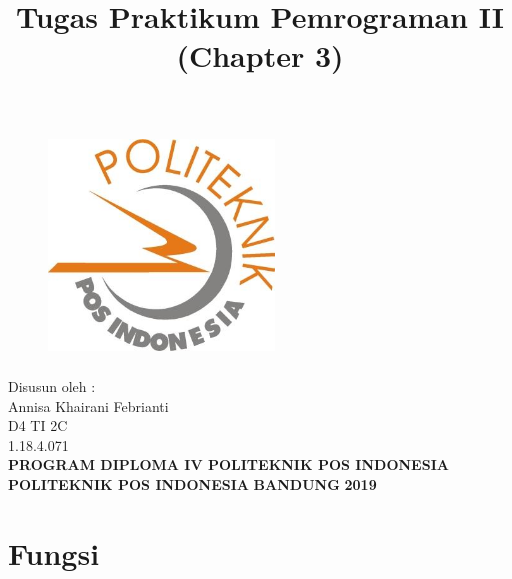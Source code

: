 \documentclass[a4paper, 12pt]{article}
\begin{document}
\title{\huge\textbf{Tugas Praktikum Pemrograman II (Chapter 3)}}
\date{}

\maketitle


\begin{figure}[!ht]
\begin{center}
\includegraphics[width = 6cm, height = 6cm]{poltekpos.jpg}
\end{center}
\end{figure}

\begin{center}
\vspace{1cm}
Disusun oleh :\\
Annisa Khairani Febrianti\\
D4 TI 2C\\
1.18.4.071\\
\vspace{1cm}
\textbf{PROGRAM DIPLOMA IV POLITEKNIK POS INDONESIA} \linebreak
\textbf{POLITEKNIK POS INDONESIA} \linebreak
\textbf{BANDUNG}\linebreak
\textbf{2019}

\end{center}


\thispagestyle{empty}


\section{Fungsi}
\end{document}
